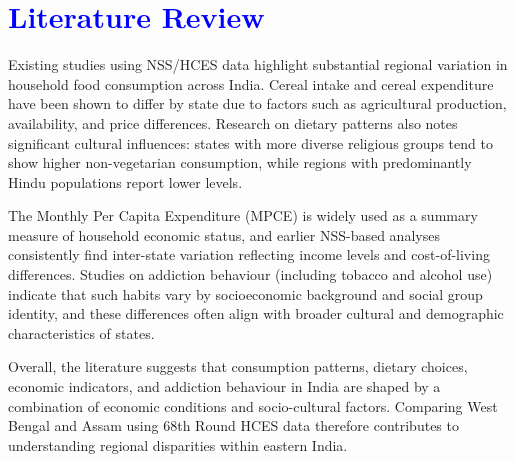\section{\textcolor{blue}{Literature Review}}

Existing studies using NSS/HCES data highlight substantial regional variation in household food consumption across India. Cereal intake and cereal expenditure have been shown to differ by state due to factors such as agricultural production, availability, and price differences. Research on dietary patterns also notes significant cultural influences: states with more diverse religious groups tend to show higher non-vegetarian consumption, while regions with predominantly Hindu populations report lower levels.

The Monthly Per Capita Expenditure (MPCE) is widely used as a summary measure of household economic status, and earlier NSS-based analyses consistently find inter-state variation reflecting income levels and cost-of-living differences. Studies on addiction behaviour (including tobacco and alcohol use) indicate that such habits vary by socioeconomic background and social group identity, and these differences often align with broader cultural and demographic characteristics of states.

Overall, the literature suggests that consumption patterns, dietary choices, economic indicators, and addiction behaviour in India are shaped by a combination of economic conditions and socio-cultural factors. Comparing West Bengal and Assam using 68th Round HCES data therefore contributes to understanding regional disparities within eastern India.
